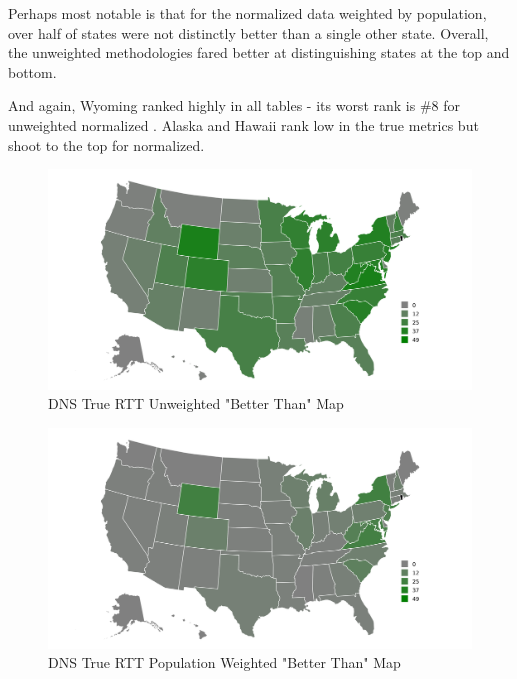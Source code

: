 

Perhaps most notable is that for the normalized \rtt data weighted by population, over half of states were not distinctly better than a single other state. Overall, the unweighted methodologies fared better at distinguishing states at the top and bottom. 

And again, Wyoming ranked highly in all tables - its worst rank is \#8 for unweighted normalized \rtt. Alaska and Hawaii rank low in the true \rtt metrics but shoot to the top for normalized.

\begin{figure}
    \centering
    \includegraphics{images/dns/analysis_auth_agg/rtt/unweighted/num_better_than_map_rtt_un.png}
    \caption{DNS True RTT Unweighted "Better Than" Map}
    \label{fig:dns_auth_agg_num_better_map_rtt_un}
\end{figure}

\begin{figure}
    \centering
    \includegraphics{images/dns/analysis_auth_agg/rtt/population/num_better_than_map_rtt_pop.png}
    \caption{DNS True RTT Population Weighted "Better Than" Map}
    \label{fig:dns_auth_agg_num_better_map_rtt_pop}
\end{figure}

